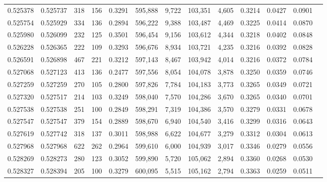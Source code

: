 \begin{tabular}{rrrrrrrrrrrrr}
0.525378 & 0.525737 &   318 &   156 &                                     0.3291 & 595,888 &   9,722 & 103,351 &   4,605 & 0.3214 & 0.0427 & 0.0901 \\
0.525754 & 0.525929 &   334 &   136 &                                     0.2894 & 596,222 &   9,388 & 103,487 &   4,469 & 0.3225 & 0.0414 & 0.0870 \\
0.525980 & 0.526099 &   232 &   125 &                                     0.3501 & 596,454 &   9,156 & 103,612 &   4,344 & 0.3218 & 0.0402 & 0.0848 \\
0.526228 & 0.526365 &   222 &   109 &                                     0.3293 & 596,676 &   8,934 & 103,721 &   4,235 & 0.3216 & 0.0392 & 0.0828 \\
0.526591 & 0.526898 &   467 &   221 &                                     0.3212 & 597,143 &   8,467 & 103,942 &   4,014 & 0.3216 & 0.0372 & 0.0784 \\
0.527068 & 0.527123 &   413 &   136 &                                     0.2477 & 597,556 &   8,054 & 104,078 &   3,878 & 0.3250 & 0.0359 & 0.0746 \\
0.527259 & 0.527259 &   270 &   105 &                                     0.2800 & 597,826 &   7,784 & 104,183 &   3,773 & 0.3265 & 0.0349 & 0.0721 \\
0.527320 & 0.527517 &   214 &   103 &                                     0.3249 & 598,040 &   7,570 & 104,286 &   3,670 & 0.3265 & 0.0340 & 0.0701 \\
0.527538 & 0.527538 &   251 &   100 &                                     0.2849 & 598,291 &   7,319 & 104,386 &   3,570 & 0.3279 & 0.0331 & 0.0678 \\
0.527547 & 0.527547 &   379 &   154 &                                     0.2889 & 598,670 &   6,940 & 104,540 &   3,416 & 0.3299 & 0.0316 & 0.0643 \\
0.527619 & 0.527742 &   318 &   137 &                                     0.3011 & 598,988 &   6,622 & 104,677 &   3,279 & 0.3312 & 0.0304 & 0.0613 \\
0.527968 & 0.527968 &   622 &   262 &                                     0.2964 & 599,610 &   6,000 & 104,939 &   3,017 & 0.3346 & 0.0279 & 0.0556 \\
0.528269 & 0.528273 &   280 &   123 &                                     0.3052 & 599,890 &   5,720 & 105,062 &   2,894 & 0.3360 & 0.0268 & 0.0530 \\
0.528327 & 0.528394 &   205 &   100 &                                     0.3279 & 600,095 &   5,515 & 105,162 &   2,794 & 0.3363 & 0.0259 & 0.0511 \\

\end{tabular}
